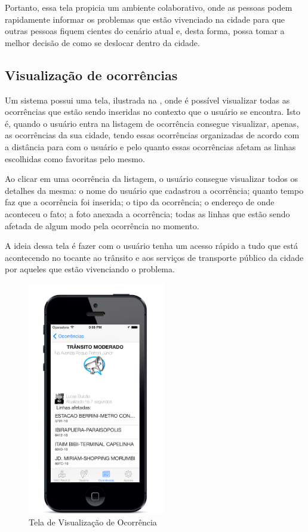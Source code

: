 Portanto, essa tela propicia um ambiente colaborativo, onde as pessoas podem rapidamente informar os problemas que estão vivenciado na cidade para que outras pessoas fiquem cientes do cenário atual e, desta forma, possa tomar a melhor decisão de como se deslocar dentro da cidade. 

\subsection{Visualização de ocorrências }

Um sistema possui uma tela, ilustrada na , onde é possível visualizar todas as ocorrências que estão sendo inseridas no contexto que o usuário se encontra. Isto é, quando o usuário entra na listagem de ocorrência consegue visualizar, apenas, as ocorrências da sua cidade, tendo essas ocorrências organizadas de acordo com a distância para com o usuário e pelo quanto essas ocorrências afetam as linhas escolhidas como favoritas pelo mesmo.   
	
Ao clicar em uma ocorrência da listagem, o usuário consegue visualizar todos os detalhes da mesma: o nome do usuário que cadastrou a ocorrência; quanto tempo faz que a ocorrência foi inserida; o tipo da ocorrência; o endereço de onde aconteceu o fato; a foto anexada a ocorrência; todas as linhas que estão sendo afetada de algum modo pela ocorrência no momento.  
	
A ideia dessa tela é fazer com o usuário tenha um acesso rápido a tudo que está acontecendo no tocante ao trânsito e aos serviços de transporte público da cidade por aqueles que estão vivenciando o problema. 

\begin{figure}[htp]
\begin{center}
  \includegraphics[width=6cm]{images/telas/visualizarOcorrencia.png}
  \caption{Tela de Visualização de Ocorrência}
  \label{fig:telaVisualizarOcorrencia}
\end{center}
\end{figure}

